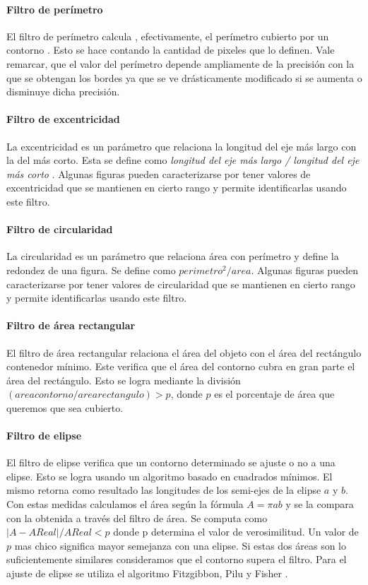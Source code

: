 	\paragraph{Filtro de perímetro}
	El filtro de perímetro calcula , efectivamente, el perímetro 
	cubierto por un contorno . Esto se hace contando la cantidad de pixeles que lo definen.
	Vale remarcar, que el valor del perímetro depende ampliamente de la precisión con la que se obtengan los bordes ya que se ve drásticamente modificado 
	si se aumenta o disminuye dicha precisión.
	\paragraph{Filtro de excentricidad}
	La excentricidad es un parámetro que relaciona la longitud del eje 
	más largo con la del más corto. Esta se define como 
	\textit { longitud del eje más largo / longitud del eje más corto}  . Algunas figuras pueden caracterizarse por tener valores de excentricidad
	que se mantienen en cierto rango y permite identificarlas usando este filtro.
	\paragraph{Filtro de circularidad}
	La circularidad es un parámetro que relaciona área con perímetro y define la redondez de una figura. Se define como $perimetro^2/area$. Algunas figuras pueden 
	caracterizarse por tener valores de circularidad que se mantienen en cierto rango y permite identificarlas usando este filtro.
	\paragraph{Filtro de área rectangular}
	El filtro de área rectangular relaciona el área del objeto con el área del rectángulo contenedor mínimo. Este verifica que el área
	del contorno cubra en gran parte el área del rectángulo. Esto se logra mediante la división $(area contorno / area rectangulo)> p$, donde 
	$p$ es el porcentaje de área que queremos que sea cubierto.
	\paragraph{Filtro de elipse}
	El filtro de elipse verifica que un contorno determinado se ajuste o no a una elipse. Esto se logra usando un algoritmo basado 
	en cuadrados mínimos. El mismo retorna como resultado las longitudes de los semi-ejes de la elipse $a$ y $b$. Con estas medidas calculamos
	el área según la fórmula $A=\pi a  b$ y se la compara con la 
	obtenida a través del filtro de área. Se computa como $|A-AReal|/ 
	AReal < p$ donde p determina el
	valor de verosimilitud. Un valor de $p$ mas chico significa mayor 
	semejanza con una elipse. Si estas dos áreas son lo suficientemente similares consideramos que el contorno supera el filtro. 
	Para el ajuste de elipse se utiliza el algoritmo Fitzgibbon, Pilu y Fisher \cite{Fitzgibbon99}.
